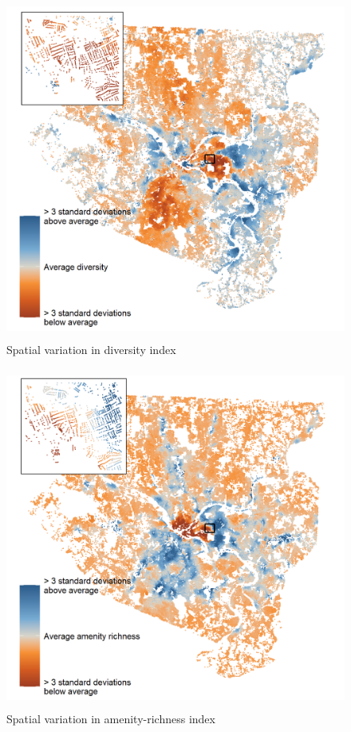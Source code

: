 \documentclass[
]{book}
\begin{document}
\begin{figure}
\includegraphics[width=1\linewidth]{04_figures/diverse} \caption{Spatial variation in diversity index}\label{fig:diverse-map}
\end{figure}

\begin{figure}
\includegraphics[width=1\linewidth]{04_figures/amenities} \caption{Spatial variation in amenity-richness index}\label{fig:amenities-map}
\end{figure}
\end{document}
